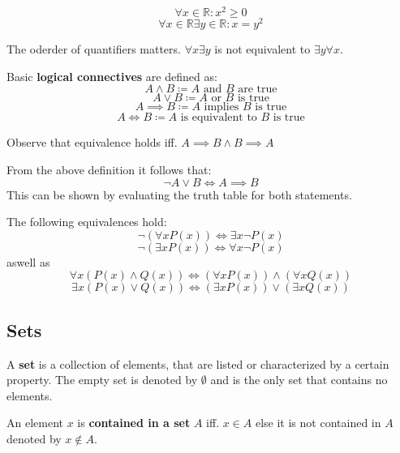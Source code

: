 \begin{example}
    $$\forall x \in \mathbb{R}: x^2 \geq 0$$
    $$\forall x \in \mathbb{R} \exists y \in \mathbb{R}: x = y^2$$
\end{example}

\begin{important}
    The oderder of quantifiers matters. $\forall x \exists y$ is not equivalent to $\exists y \forall x$.
\end{important}

\begin{definition}
    Basic \textbf{logical connectives} are defined as:
    $$A \land B \coloneqq A \text{ and } B \text{ are true}$$
    $$A \lor B \coloneqq A \text{ or } B \text{ is true}$$
    $$A \implies B \coloneqq A \text{ implies } B \text{ is true}$$
    $$A \iff B \coloneqq A \text{ is equivalent to } B \text{ is true}$$
\end{definition}

\begin{remark}
    Observe that equivalence holds iff. $A \implies B \land B \implies A$
\end{remark}

\begin{lemma}
    From the above definition it follows that:
    $$ \neg A \lor B \iff A \implies B$$
    This can be shown by evaluating the truth table for both statements.
\end{lemma}

\begin{theorem}
    The following equivalences hold:
    $$\neg (\forall x P(x)) \iff \exists x \neg P(x)$$
    $$\neg (\exists x P(x)) \iff \forall x \neg P(x)$$
    aswell as
    $$\forall x (P(x) \land Q(x)) \iff (\forall x P(x)) \land (\forall x Q(x))$$
    $$\exists x (P(x) \lor Q(x)) \iff (\exists x P(x)) \lor (\exists x Q(x))$$
\end{theorem}

\subsection{Sets}

\begin{definition}
    A \textbf{set} is a collection of elements, that are listed or characterized by a certain property. 
    The empty set is denoted by $\emptyset$ and is the only set that contains no elements.
\end{definition}

\begin{definition}
    An element $x$ is \textbf{contained in a set} $A$ iff. $x \in A$ else it is not contained in $A$ denoted by $x \notin A$.
\end{definition}

